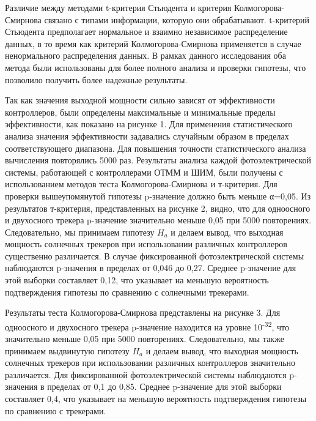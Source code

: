 \begin{multicols}{2}
Различие между методами t-критерия Стьюдента и критерия
Колмогорова-Смирнова связано с типами информации, которую они
обрабатывают. t-критерий Стьюдента предполагает нормальное и взаимно
независимое распределение данных, в то время как критерий
Колмогорова-Смирнова применяется в случае ненормального распределения
данных. В рамках данного исследования оба метода были использованы для
более полного анализа и проверки гипотезы, что позволило получить более
надежные результаты.

Так как значения выходной мощности сильно зависят от эффективности
контроллеров, были определены максимальные и минимальные пределы
эффективности, как показано на рисунке 1. Для применения статистического
анализа значения эффективности задавались случайным образом в пределах
соответствующего диапазона. Для повышения точности статистического
анализа вычисления повторялись 5000 раз. Результаты анализа каждой
фотоэлектрической системы, работающей с контроллерами ОТММ и ШИМ, были
получены с использованием методов теста Колмогорова-Смирнова и
т-критерия. Для проверки вышеупомянутой гипотезы p-значение должно быть
меньше α=0,05. Из результатов т-критерия, представленных на рисунке 2,
видно, что для одноосного и двухосного трекера p-значение значительно
меньше 0,05 при 5000 повторениях. Следовательно, мы принимаем гипотезу
\(H_{a}\) и делаем вывод, что выходная мощность солнечных трекеров при
использовании различных контроллеров существенно различается. В случае
фиксированной фотоэлектрической системы наблюдаются p-значения в
пределах от 0,046 до 0,27. Среднее p-значение для этой выборки
составляет 0,12, что указывает на меньшую вероятность подтверждения
гипотезы по сравнению с солнечными трекерами.

Результаты теста Колмогорова-Смирнова представлены на рисунке 3. Для
одноосного и двухосного трекера p-значение находится на уровне
10\textsuperscript{-32}, что значительно меньше 0,05 при 5000
повторениях. Следовательно, мы также принимаем выдвинутую гипотезу
\(H_{a}\) и делаем вывод, что выходная мощность солнечных трекеров при
использовании различных контроллеров значительно различается. Для
фиксированной фотоэлектрической системы наблюдаются p-значения в
пределах от 0,1 до 0,85. Среднее p-значение для этой выборки составляет
0,4, что указывает на меньшую вероятность подтверждения гипотезы по
сравнению с трекерами.
\end{multicols}


